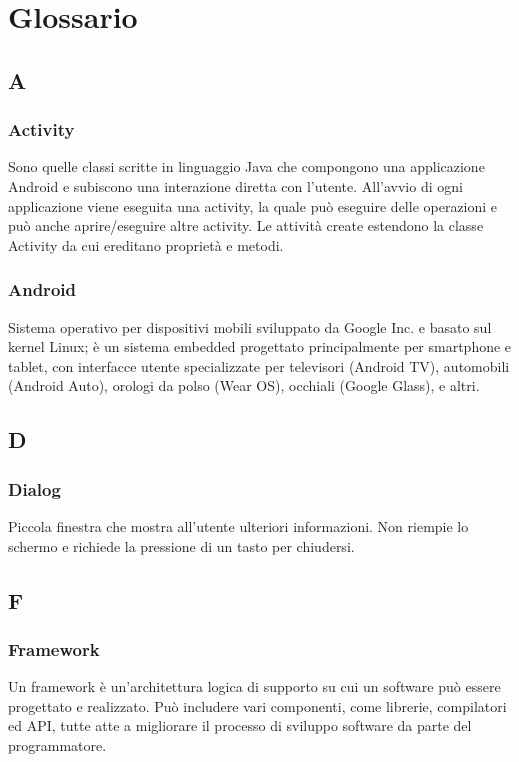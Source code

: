 \section{Glossario}
\subsection*{A}
\subsubsection*{Activity}
Sono quelle classi scritte in linguaggio Java che compongono una applicazione Android e subiscono
una interazione diretta con l'utente. All'avvio di ogni applicazione viene eseguita una activity, la
quale può eseguire delle operazioni e può anche aprire/eseguire altre activity. Le attività create
estendono la classe Activity da cui ereditano proprietà e metodi.

\subsubsection*{Android}
Sistema operativo per dispositivi mobili sviluppato da Google Inc. e basato sul kernel Linux; è
un sistema embedded progettato principalmente per smartphone e tablet, con interfacce utente
specializzate per televisori (Android TV), automobili (Android Auto), orologi da polso (Wear
OS), occhiali (Google Glass), e altri.

\subsection*{D}
\subsubsection*{Dialog}
Piccola finestra che mostra all'utente ulteriori informazioni. Non riempie lo schermo e richiede la pressione di un tasto per chiudersi.

\subsection*{F}
\subsubsection*{Framework}
Un framework è un'architettura logica di supporto su cui un software può essere progettato e
realizzato. Può includere vari componenti, come librerie, compilatori ed API\glo, tutte atte a
migliorare il processo di sviluppo software da parte del programmatore.

